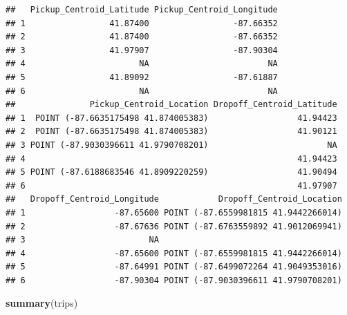 \documentclass[
]{article}
\newenvironment{Shaded}{\begin{snugshade}}{\end{snugshade}}
\newcommand{\FunctionTok}[1]{\textcolor[rgb]{0.13,0.29,0.53}{\textbf{#1}}}
\newcommand{\NormalTok}[1]{#1}
\begin{document}
\begin{verbatim}
##   Pickup_Centroid_Latitude Pickup_Centroid_Longitude
## 1                 41.87400                 -87.66352
## 2                 41.87400                 -87.66352
## 3                 41.97907                 -87.90304
## 4                       NA                        NA
## 5                 41.89092                 -87.61887
## 6                       NA                        NA
##               Pickup_Centroid_Location Dropoff_Centroid_Latitude
## 1  POINT (-87.6635175498 41.874005383)                  41.94423
## 2  POINT (-87.6635175498 41.874005383)                  41.90121
## 3 POINT (-87.9030396611 41.9790708201)                        NA
## 4                                                       41.94423
## 5 POINT (-87.6188683546 41.8909220259)                  41.90494
## 6                                                       41.97907
##   Dropoff_Centroid_Longitude            Dropoff_Centroid_Location
## 1                  -87.65600 POINT (-87.6559981815 41.9442266014)
## 2                  -87.67636 POINT (-87.6763559892 41.9012069941)
## 3                         NA                                     
## 4                  -87.65600 POINT (-87.6559981815 41.9442266014)
## 5                  -87.64991 POINT (-87.6499072264 41.9049353016)
## 6                  -87.90304 POINT (-87.9030396611 41.9790708201)
\end{verbatim}

\begin{Shaded}
\begin{Highlighting}[]
\FunctionTok{summary}\NormalTok{(trips)}
\end{Highlighting}
\end{Shaded}
\end{document}
